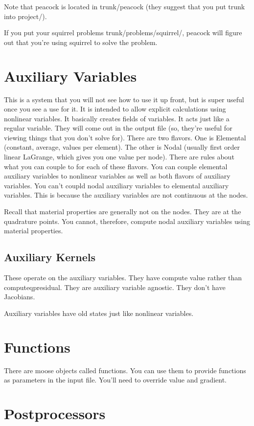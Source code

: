 Note that peacock is located in trunk/peacock (they suggest that you put trunk 
into project/).

If you put your squirrel problems trunk/problems/squirrel/, peacock will figure 
out that you're using squirrel to solve the problem. 


\section{Auxiliary Variables}
This is a system that you will not see how to use it up front, but is super 
useful once you see a use for it. It is intended to allow explicit calculations 
using nonlinear variables. It basically creates fields of variables.  It acts 
just like a regular variable. They will come out in the output file (so, they're 
useful for viewing things that you don't solve for). There are two flavors. One 
is Elemental (constant, average, values per element). The other is Nodal (usually first 
order linear LaGrange, which gives you one value per node). There are rules 
about what you can couple to for each of these flavors. 
You can 
couple elemental auxiliary variables to nonlinear variables as well as both 
flavors of auxiliary variables. You can't coupld nodal auxiliary variables to 
elemental auxiliary variables. This is because the auxiliary variables are not 
continuous at the nodes. 

Recall that material properties are generally not on the nodes. They are at the 
quadrature points. You cannot, therefore, compute nodal auxiliary variables 
using material properties.  

\subsection{Auxiliary Kernels}
These operate on the auxiliary variables. They have compute value rather than 
computeqpresidual. They are auxiliary variable agnostic. They don't have 
Jacobians. 


Auxiliary variables have old states just like nonlinear variables. 
\section{Functions}
There are moose objects called functions. You can use them to provide functions 
as parameters in the input file. You'll need to override value and gradient. 

\section{Postprocessors}


